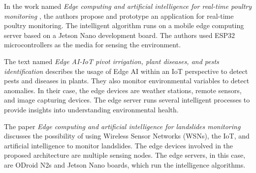 
In the work named \textit{Edge computing and artificial intelligence for real-time poultry monitoring \cite{debauche2020edge}}, the authors propose and prototype an application for real-time poultry monitoring. The intelligent algorithm runs on a mobile edge computing server based on a Jetson Nano development board. The authors used ESP32 microcontrollers as the media for sensing the environment.



The text named \textit{Edge AI-IoT pivot irrigation, plant diseases, and pests identification \cite{debauche2020edge-1}} describes the usage of Edge AI within an IoT perspective to detect pests and diseases in plants. They also monitor environmental variables to detect anomalies. In their case, the edge devices are weather stations, remote sensors, and image capturing devices. The edge server runs several intelligent processes to provide insights into understanding environmental health.



The paper \textit{Edge computing and artificial intelligence for landslides monitoring \cite{elmoulat2020edge}} discusses the possibility of using Wireless Sensor Networks (WSNs), the IoT, and artificial intelligence to monitor landslides. The edge devices involved in the proposed architecture are multiple sensing nodes. The edge servers, in this case, are ODroid N2s and Jetson Nano boards, which run the intelligence algorithms.


